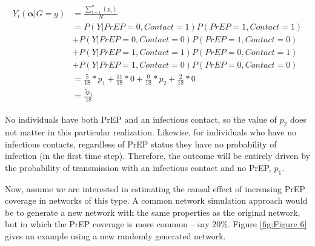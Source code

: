 \documentclass{article}
\theoremstyle{definition}
\begin{document}
\begin{align}\label{eq:10}
\begin{split}
Y_{i}\left(\mathbf{\alpha}|G=g\right) & = \frac{\sum_{i=1}^{n}(p_{i})}{N}  \\ 
& = P\left(Y|PrEP = 0, Contact = 1\right)P\left(PrEP = 1, Contact = 1\right)  \\ \nonumber
& +P\left(Y|PrEP = 0, Contact = 0\right)P\left(PrEP = 1, Contact = 0\right)  \\ \nonumber
& +P\left(Y|PrEP = 1, Contact = 1\right)P\left(PrEP = 0, Contact = 1\right) \\ \nonumber
&  +P\left(Y|PrEP = 1, Contact = 0\right)P\left(PrEP = 0, Contact = 0\right) \\ \nonumber
 &=  \frac{5}{18}*p_1 +  \frac{11}{18}*0 +\frac{0}{18}*p_2 +  \frac{2}{18}*0 \\ \nonumber
 &=\frac{5p_1}{18}  \nonumber
\end{split}
\end{align}

No individuals have both PrEP and an infectious contact, so the value of $p_2$ does not matter in this particular realization. Likewise, for individuals who have no infectious contacts, regardless of PrEP status they have no probability of infection (in the first time step). Therefore, the outcome will be entirely driven by the probability of transmission with an infectious contact and no PrEP, $p_1$.

Now, assume we are interested in estimating the causal effect of increasing PrEP coverage in networks of this type. A common network simulation approach would be to generate a new network with the same properties as the original network, but in which the PrEP coverage is more common -- say 20\%. Figure \ref{fig:Figure 6} gives an example using a new randomly generated network.
\end{document}
